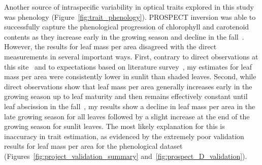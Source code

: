 Another source of intraspecific variability in optical traits explored in this study was phenology (Figure~\ref{fig:trait_phenology}).
PROSPECT inversion was able to successfully capture the phenological progression of chlorophyll and carotenoid contents as they increase early in the growing season and decline in the fall~\cite{yang_2014_beyond,yang_2016_seasonal}.
However, the results for leaf mass per area disagreed with the direct measurements in several important ways.
First, contrary to direct observations at this site~\cite{yang_2016_seasonal} and to expectations based on literature survey~\cite{poorter_2009_causes}, my estimates for leaf mass per area were consistently lower in sunlit than shaded leaves.
Second, while direct observations show that leaf mass per area generally increases early in the growing season up to leaf maturity and then remains effectively constant until leaf abscission in the fall~\cite{yang_2014_beyond,yang_2016_seasonal},
my results show a decline in leaf mass per area in the late growing season for all leaves followed by a slight increase at the end of the growing season for sunlit leaves.
The most likely explanation for this is inaccuracy in trait estimation, as evidenced by the extremely poor validation results for leaf mass per area for the phenological dataset (Figures~\ref{fig:project_validation_summary} and~\ref{fig:prospect_D_validation}).

